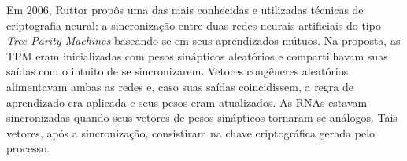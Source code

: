 \documentclass[12pt]{article}
\begin{document}
    
        
        Em 2006, Ruttor \cite{ruttor2007neural} propôs uma das mais conhecidas e utilizadas técnicas de criptografia neural: a sincronização entre duas redes neurais artificiais do tipo \textit{Tree Parity Machines} baseando-se em seus aprendizados mútuos. Na proposta, as TPM eram inicializadas com pesos sinápticos aleatórios e compartilhavam suas saídas com o intuito de se sincronizarem. Vetores congêneres aleatórios alimentavam ambas as redes e, caso suas saídas coincidissem, a regra de aprendizado era aplicada e seus pesos eram atualizados. As RNAs estavam sincronizadas quando seus vetores de pesos sinápticos tornaram-se análogos. Tais vetores, após a sincronização, consistiram na chave criptográfica gerada pelo processo.
        
    
\end{document}
